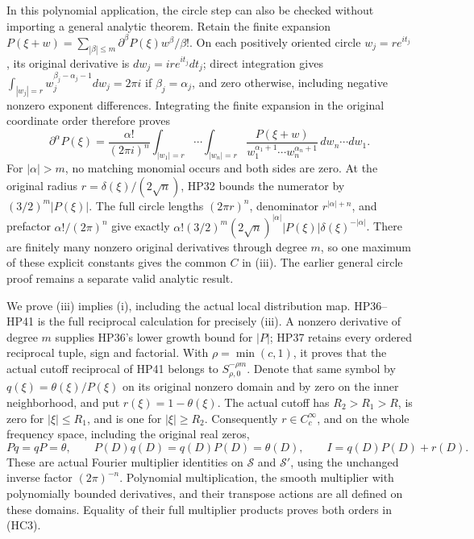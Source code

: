 \documentclass[
  11pt,
]{article}
\begin{document}
In this polynomial application, the circle step can also be checked
without importing a general analytic theorem. Retain the finite
expansion
\(P(\xi+w)=\sum_{|\beta|\le m}\partial^\beta P(\xi)w^\beta/\beta!\). On
each positively oriented circle \(w_j=re^{it_j}\), its original
derivative is \(dw_j=ire^{it_j}dt_j\); direct integration gives
\(\int_{|w_j|=r}w_j^{\beta_j-\alpha_j-1}dw_j=2\pi i\) if
\(\beta_j=\alpha_j\), and zero otherwise, including negative nonzero
exponent differences. Integrating the finite expansion in the original
coordinate order therefore proves \[
\partial^\alpha P(\xi)=\frac{\alpha!}{(2\pi i)^n}
 \int_{|w_1|=r}\cdots\int_{|w_n|=r}
 \frac{P(\xi+w)}{w_1^{\alpha_1+1}\cdots w_n^{\alpha_n+1}}
 \,dw_n\cdots dw_1.
\tag{HC2}
\] For \(|\alpha|>m\), no matching monomial occurs and both sides are
zero. At the original radius \(r=\delta(\xi)/(2\sqrt n)\), HP32 bounds
the numerator by \((3/2)^m|P(\xi)|\). The full circle lengths
\((2\pi r)^n\), denominator \(r^{|\alpha|+n}\), and prefactor
\(\alpha!/(2\pi)^n\) give exactly
\(\alpha!(3/2)^m(2\sqrt n)^{|\alpha|}|P(\xi)|\delta(\xi)^{-|\alpha|}\).
There are finitely many nonzero original derivatives through degree
\(m\), so one maximum of these explicit constants gives the common \(C\)
in (iii). The earlier general circle proof remains a separate valid
analytic result.

We prove (iii) implies (i), including the actual local distribution map.
HP36--HP41 is the full reciprocal calculation for precisely (iii). A
nonzero derivative of degree \(m\) supplies HP36's lower growth bound
for \(|P|\); HP37 retains every ordered reciprocal tuple, sign and
factorial. With \(\rho=\min(c,1)\), it proves that the actual cutoff
reciprocal of HP41 belongs to \(S^{-\rho m}_{\rho,0}\). Denote that same
symbol by \(q(\xi)=\theta(\xi)/P(\xi)\) on its original nonzero domain
and by zero on the inner neighborhood, and put \(r(\xi)=1-\theta(\xi)\).
The actual cutoff has \(R_2>R_1>R\), is zero for \(|\xi|\le R_1\), and
is one for \(|\xi|\ge R_2\). Consequently \(r\in C_c^\infty\), and on
the whole frequency space, including the original real zeros, \[
Pq=qP=\theta,\qquad
P(D)q(D)=q(D)P(D)=\theta(D),\qquad
I=q(D)P(D)+r(D).
\tag{HC3}
\] These are actual Fourier multiplier identities on \(\mathcal S\) and
\(\mathcal S'\), using the unchanged inverse factor \((2\pi)^{-n}\).
Polynomial multiplication, the smooth multiplier with polynomially
bounded derivatives, and their transpose actions are all defined on
these domains. Equality of their full multiplier products proves both
orders in (HC3).
\end{document}
